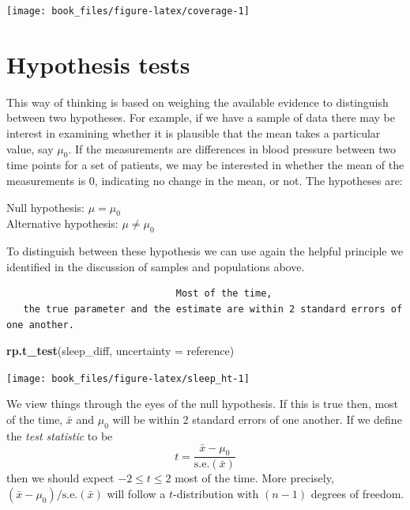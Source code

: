 \documentclass[
]{book}
\newenvironment{Shaded}{\begin{snugshade}}{\end{snugshade}}
\newcommand{\AttributeTok}[1]{\textcolor[rgb]{0.13,0.29,0.53}{#1}}
\newcommand{\FunctionTok}[1]{\textcolor[rgb]{0.13,0.29,0.53}{\textbf{#1}}}
\newcommand{\NormalTok}[1]{#1}
\newcommand{\StringTok}[1]{\textcolor[rgb]{0.31,0.60,0.02}{#1}}
\begin{document}
\begin{center}\texttt{[image: book\_files/figure-latex/coverage-1]} \end{center}

\section{Hypothesis tests}\label{hypothesis-tests}

This way of thinking is based on weighing the available evidence to distinguish between two hypotheses. For example, if we have a sample of data there may be interest in examining whether it is plausible that the mean takes a particular value, say \(\mu_0\). If the measurements are differences in blood pressure between two time points for a set of patients, we may be interested in whether the mean of the measurements is 0, indicating no change in the mean, or not. The hypotheses are:

Null hypothesis: \(\mu = \mu_0\)\\
Alternative hypothesis: \(\mu \neq \mu_0\)

To distinguish between these hypothesis we can use again the helpful principle we identified in the discussion of samples and populations above.

\begin{verbatim}
                              Most of the time,
   the true parameter and the estimate are within 2 standard errors of one another.
\end{verbatim}

\begin{Shaded}
\begin{Highlighting}[]
\FunctionTok{rp.t\_test}\NormalTok{(sleep\_diff, }\AttributeTok{uncertainty =} \StringTok{\textquotesingle{}reference\textquotesingle{}}\NormalTok{)}
\end{Highlighting}
\end{Shaded}

\begin{center}\texttt{[image: book\_files/figure-latex/sleep\_ht-1]} \end{center}

We view things through the eyes of the null hypothesis. If this is true then, most of the time, \(\bar x\) and \(\mu_0\) will be within 2 standard errors of one another. If we define the \emph{test statistic} to be
\[
      t = \frac{\bar{x} - \mu_0}{\mbox{s.e.}(\bar{x})}
\]
then we should expect \(-2 \leq t \leq 2\) most of the time. More precisely, \((\bar{x} - \mu_0) / \mbox{s.e.}(\bar{x})\) will follow a \(t\)-distribution with \((n-1)\) degrees of freedom.
\end{document}
